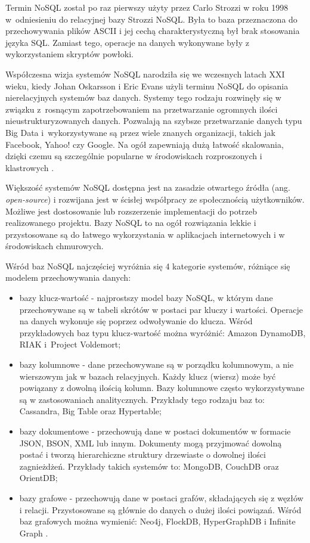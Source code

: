 \documentclass[a4paper,twoside,12pt]{book}
\newcommand{\obcy}[1]{\emph{#1}}
\newcommand{\ang}[1]{{\selectlanguage{british}\obcy{#1}}}
\begin{document}
Termin NoSQL został po raz pierwszy użyty przez Carlo Strozzi w roku 1998 w~odniesieniu do relacyjnej bazy Strozzi NoSQL. Była to baza przeznaczona do przechowywania plików ASCII i jej cechą charakterystyczną był brak stosowania języka SQL. Zamiast tego, operacje na danych wykonywane były z wykorzystaniem skryptów powłoki.

Współczesna wizja systemów NoSQL narodziła się we wczesnych latach XXI wieku, kiedy Johan Oskarsson i Eric Evans użyli terminu NoSQL do opisania nierelacyjnych systemów baz danych. Systemy tego rodzaju rozwinęły się w związku z~rosnącym zapotrzebowaniem na przetwarzanie ogromnych ilości nieustrukturyzowanych danych. Pozwalają na szybsze przetwarzanie danych typu Big Data i~wykorzystywane są przez wiele znanych organizacji, takich jak Facebook, Yahoo! czy Google. Na ogół zapewniają dużą łatwość skalowania, dzięki czemu są szczególnie popularne w środowiskach rozproszonych i klastrowych \cite{bib:type-of-nosql-databases-and-its-comparison-with-relational-databases}.

Większość systemów NoSQL dostępna jest na zasadzie otwartego źródła (ang. \ang{open-source}) i rozwijana jest w ścisłej współpracy ze społecznością użytkowników. Możliwe jest dostosowanie lub rozszerzenie implementacji do potrzeb realizowanego projektu. Bazy NoSQL to na ogół rozwiązania lekkie i przystosowane są do łatwego wykorzystania w aplikacjach internetowych i w środowiskach chmurowych. 

Wśród baz NoSQL najczęściej wyróżnia się 4 kategorie systemów, różniące się modelem przechowywania danych:

\begin{itemize}
\item bazy klucz-wartość - najprostszy model bazy NoSQL, w którym dane przechowywane są w tabeli skrótów w postaci par kluczy i wartości. Operacje na danych wykonuje się poprzez odwoływanie do klucza. Wśród przykładowych baz typu klucz-wartość można wyróżnić: Amazon DynamoDB, RIAK i~Project Voldemort;
\item bazy kolumnowe - dane przechowywane są w porządku kolumnowym, a nie wierszowym jak w bazach relacyjnych. Każdy klucz (wiersz) może być powiązany z dowolną ilością kolumn. Bazy kolumnowe często wykorzystywane są w zastosowaniach analitycznych. Przykłady tego rodzaju baz to: Cassandra, Big Table oraz Hypertable;
\item bazy dokumentowe - przechowują dane w postaci dokumentów w formacie JSON, BSON, XML lub innym. Dokumenty mogą przyjmować dowolną postać i tworzą hierarchiczne struktury drzewiaste o dowolnej ilości zagnieżdżeń. Przykłady takich systemów to: MongoDB, CouchDB oraz OrientDB;
\item bazy grafowe - przechowują dane w postaci grafów, składających się z węzłów i relacji. Przystosowane są głównie do danych o dużej ilości powiązań. Wśród baz grafowych można wymienić: Neo4j, FlockDB, HyperGraphDB i Infinite Graph \cite{bib:no-sql-kompendium-wiedzy}.
\end{itemize}
\end{document}
